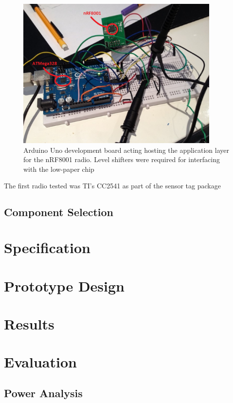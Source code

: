 \documentclass[]{article}
\begin{document}
\begin{figure}[htb]
	\begin{center}
		\includegraphics[width = 0.9\textwidth]{nrf8001}
	\end{center}
	\caption{Arduino Uno development board acting hosting the application layer for the nRF8001 radio. Level shifters were required for interfacing with the low-paper chip}
	\label{fig:nrf8001}
\end{figure}

The first radio tested was \ac{TI}'s CC2541 as part of the sensor tag package 
\subsection{Component Selection}

\section{Specification}

\section{Prototype Design}

\section{Results}

\section{Evaluation}

\subsection{Power Analysis}
\end{document}
